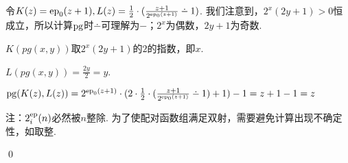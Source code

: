 \begin{pf} \rm 
    令$K(z)=\ep_0(z+1), L(z)=\frac{1}{2}\cdot(\frac{z+1}{2^{\ep_0(z+1)}}\dotminus 1)$. 我们注意到，$2^x(2y+1)>0$恒成立，所以计算$\mathrm{pg}$时$\dotminus$可理解为$-$；$2^x$为偶数，$2y+1$为奇数. 

    $K(pg(x,y))$取$2^x(2y+1)$的$2$的指数，即$x$.

    $L(pg(x,y))=\frac{2y}{2}=y$.

    $\pg(K(z), L(z))=2^{\ep_0(z+1)}\cdot
    (2\cdot \frac{1}{2}\cdot(\frac{z+1}{2^{\ep_0(z+1)}}\dotminus 1)+1)-1=z+1- 1=z$
    
    注：$2^{\mathrm{ep}}_i(n)$必然被$n$整除. 为了使配对函数组满足双射，需要避免计算出现不确定性，如取整. 

    \qed
\end{pf}
